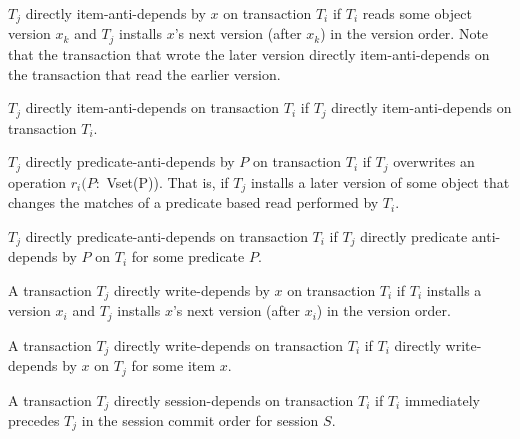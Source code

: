 \begin{definition}
$T_j$ directly item-anti-depends by $x$ on transaction $T_i$ if $T_i$
  reads some object version $x_k$ and $T_j$ installs $x$'s next
  version (after $x_k$) in the version order. Note that the
  transaction that wrote the later version directly item-anti-depends
  on the transaction that read the earlier version.
\end{definition}

\begin{definition}
$T_j$ directly item-anti-depends on transaction $T_i$ if $T_j$
  directly item-anti-depends on transaction $T_i$.
\end{definition}

\begin{definition}
$T_j$ directly predicate-anti-depends by $P$ on transaction $T_i$ if
  $T_j$ overwrites an operation $r_i(P:$ Vset(P)). That is, if $T_j$
  installs a later version of some object that changes the matches of
  a predicate based read performed by $T_i$.
\end{definition}

\begin{definition}
$T_j$ directly predicate-anti-depends on transaction $T_i$ if $T_j$
  directly predicate anti-depends by $P$ on $T_i$ for some predicate
  $P$.
\end{definition}

\begin{definition}
A transaction $T_j$ directly write-depends by $x$ on transaction $T_i$
if $T_i$ installs a version $x_i$ and $T_j$ installs $x$'s next
version (after $x_i$) in the version order.
\end{definition}

\begin{definition}
A transaction $T_j$ directly write-depends on transaction $T_i$ if
$T_i$ directly write-depends by $x$ on $T_j$ for some item $x$.
\end{definition}

\begin{definition}
A transaction $T_j$ directly session-depends on transaction $T_i$ if
$T_i$ immediately precedes $T_j$ in the session commit order for session $S$.
\end{definition}

